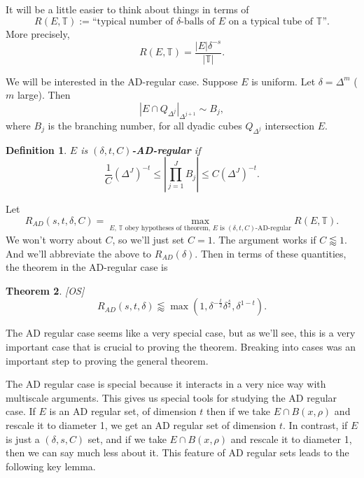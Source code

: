 \documentclass[12pt]{amsart}
\newtheorem{theorem}{Theorem}[section]
\newtheorem{Definition}[theorem]{Definition}
\begin{document}
It will be a little easier to think about things in terms of
\[
    R(E, \mathbb{T}) := \text{``typical number of $\delta$-balls of $E$ on a typical tube of $\mathbb{T}$''}.
\]
More precisely,
\[
    R(E, \mathbb{T}) = \frac{|E| \delta^{-s}}{|\mathbb{T}|}.
\]

We will be interested in the AD-regular case. Suppose $E$ is uniform. Let $\delta = \Delta^m$ ($m$ large). Then
\[
    |E \cap Q_{\Delta^j}|_{\Delta^{j + 1}} \sim B_j,
\]
where $B_j$ is the branching number, for all dyadic cubes $Q_{\Delta^j}$ intersection $E$.

\begin{Definition}
    $E$ is \textbf{$(\delta, t, C)$-AD-regular} if
    \[
        \frac{1}{C} (\Delta^J)^{-t} \leq \left| \prod_{j = 1}^J B_j \right| \leq C(\Delta^J)^{-t}.
    \]
\end{Definition}
Let
\[
    R_{AD}(s, t, \delta, C) = \max_{\text{$E$, $\mathbb{T}$ obey hypotheses of theorem, $E$ is $(\delta, t, C)$-AD-regular}} R(E, \mathbb{T}).
\]
We won't worry about $C$, so we'll just set $C = 1$. The argument works if $C \lessapprox 1$. And we'll abbreviate the above to $R_{AD}(\delta)$. Then in terms of these quantities, the theorem in the AD-regular case is
\begin{theorem} \label{thmOSAD} [OS]
    \[
        R_{AD}(s, t, \delta) \lessapprox \max \left( 1, \delta^{-\frac{t}{2}} \delta^{\frac{s}{2}}, \delta^{1 - t} \right).
    \]
\end{theorem}

The AD regular case seems like a very special case, but as we'll see, this is a very important case that is crucial to proving the theorem. Breaking into cases was an important step to proving the general theorem.

The AD regular case is special because it interacts in a very nice way with multiscale arguments.  This gives us special tools for studying the AD regular case.   If $E$ is an AD regular set, of dimension $t$  then if we take $E \cap B(x, \rho)$ and rescale it to diameter 1,  we get an AD regular set of dimension $t$.   In contrast, if $E$ is just a $(\delta, s, C)$ set,  and if we take $E \cap B(x, \rho)$ and rescale it to diameter 1,  then we can say much less about it.   This feature of AD regular sets leads to the following key lemma.
\end{document}
